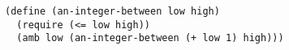 \documentclass[a4paper,12pt]{article}
\begin{document}
\begin{lstlisting}
(define (an-integer-between low high)
  (require (<= low high))
  (amb low (an-integer-between (+ low 1) high)))
\end{lstlisting}
\end{document}
